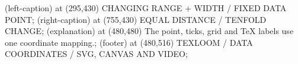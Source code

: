 \documentclass{article}
\begin{document}
\begin{loomscene}[width=960,height=540,duration=12,title={Coordinates stay. The frame changes.}]
\loomnode[caption,text=mint] (left-caption) at (295,430) {CHANGING RANGE + WIDTH / FIXED DATA POINT};
\loomnode[caption,text=gold] (right-caption) at (755,430) {EQUAL DISTANCE / TENFOLD CHANGE};
\loomnode[small] (explanation) at (480,480) {The point, ticks, grid and TeX labels use one coordinate mapping.};
\loomnode[caption] (footer) at (480,516) {TEXLOOM / DATA COORDINATES / SVG, CANVAS AND VIDEO};
\end{loomscene}
\end{document}
